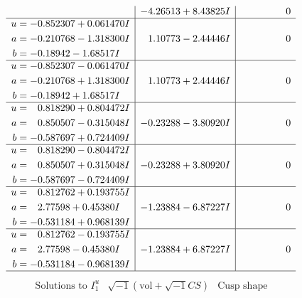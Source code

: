 \documentclass[1p]{elsarticle_modified}
\theoremstyle{definition}
\newcommand{\I}{\sqrt{-1}}
\begin{document}
$$\begin{array}{c|c|c}
 & -4.26513 + 8.43825 I & \phantom{-0.000000 } 0 \\ \hline\begin{aligned}
u &= -0.852307 + 0.061470 I \\
a &= -0.210768 - 1.318300 I \\
b &= -0.18942 - 1.68517 I\end{aligned}
 & \phantom{-}1.10773 - 2.44446 I & \phantom{-0.000000 } 0 \\ \hline\begin{aligned}
u &= -0.852307 - 0.061470 I \\
a &= -0.210768 + 1.318300 I \\
b &= -0.18942 + 1.68517 I\end{aligned}
 & \phantom{-}1.10773 + 2.44446 I & \phantom{-0.000000 } 0 \\ \hline\begin{aligned}
u &= \phantom{-}0.818290 + 0.804472 I \\
a &= \phantom{-}0.850507 - 0.315048 I \\
b &= -0.587697 + 0.724409 I\end{aligned}
 & -0.23288 - 3.80920 I & \phantom{-0.000000 } 0 \\ \hline\begin{aligned}
u &= \phantom{-}0.818290 - 0.804472 I \\
a &= \phantom{-}0.850507 + 0.315048 I \\
b &= -0.587697 - 0.724409 I\end{aligned}
 & -0.23288 + 3.80920 I & \phantom{-0.000000 } 0 \\ \hline\begin{aligned}
u &= \phantom{-}0.812762 + 0.193755 I \\
a &= \phantom{-}2.77598 + 0.45380 I \\
b &= -0.531184 + 0.968139 I\end{aligned}
 & -1.23884 - 6.87227 I & \phantom{-0.000000 } 0 \\ \hline\begin{aligned}
u &= \phantom{-}0.812762 - 0.193755 I \\
a &= \phantom{-}2.77598 - 0.45380 I \\
b &= -0.531184 - 0.968139 I\end{aligned}
 & -1.23884 + 6.87227 I & \phantom{-0.000000 } 0\\
 \hline 
 \end{array}$$\newpage$$\begin{array}{c|c|c}  
\text{Solutions to }I^u_{1}& \I (\text{vol} + \sqrt{-1}CS) & \text{Cusp shape}\\

\end{array}$$
\end{document}
